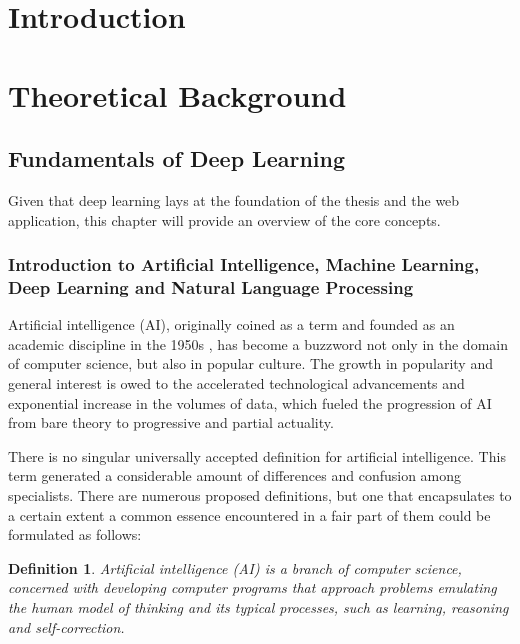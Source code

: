 \documentclass[12pt, a4paper]{article}
\newtheorem{definition}{Definition}
\begin{document}
  

  \tableofcontents
  \newpage

  \section{Introduction}
  \newpage

  \section{Theoretical Background}
  \subsection{Fundamentals of Deep Learning}

  Given that deep learning lays at the foundation of the thesis and the web application, this chapter will provide an overview of the core concepts.

  \subsubsection{Introduction to Artificial Intelligence, Machine Learning, Deep Learning and Natural Language Processing}
  
  Artificial intelligence (AI), originally coined as a term and founded as an academic discipline in the 1950s \cite{a5}, has become a buzzword not only in the domain of computer science, but also in popular culture. The growth in popularity and general interest is owed to the accelerated technological advancements and exponential increase in the volumes of data, which fueled the progression of AI from bare theory to progressive and partial actuality.

  There is no singular universally accepted definition for artificial intelligence. This term generated a considerable amount of differences and confusion among specialists\cite{a6}. There are numerous proposed definitions, but one that encapsulates to a certain extent a common essence encountered in a fair part of them could be formulated as follows:

  \begin{definition}
    Artificial intelligence (AI) is a branch of computer science, concerned with developing computer programs that approach problems emulating the human model of thinking and its typical processes, such as learning, reasoning and self-correction.
  \end{definition}
\end{document}
